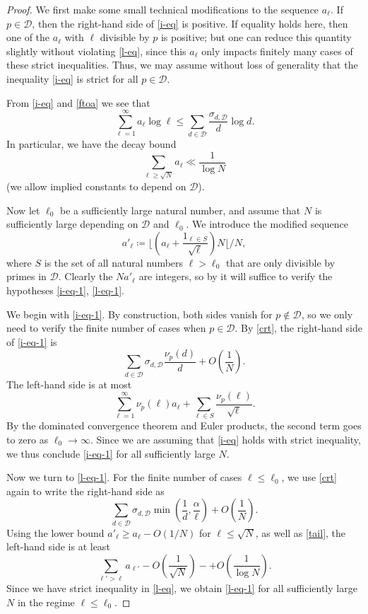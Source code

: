\documentclass[12pt,a4paper,reqno]{amsart}
\numberwithin{equation}{section}
\theoremstyle{plain}
\theoremstyle{definition}
\begin{document}
\begin{proof}  We first make some small technical modifications to the sequence $a_\ell$. If $p \in {\mathcal D}$, then the right-hand side of \eqref{i-eq} is positive.  If equality holds here, then one of the $a_\ell$ with $\ell$ divisible by $p$ is positive; but one can reduce this quantity slightly without violating \eqref{l-eq}, since this $a_\ell$ only impacts finitely many cases of these strict inequalities.  Thus, we may assume without loss of generality that the inequality \eqref{i-eq} is strict for all $p \in {\mathcal D}$.

From \eqref{i-eq} and \eqref{ftoa} we see that
$$ \sum_{\ell=1}^\infty a_\ell \log \ell \leq \sum_{d \in {\mathcal D}} \frac{\sigma_{d,{\mathcal D}}}{d} \log d.$$
In particular, we have the decay bound
\begin{equation}\label{tail}
  \sum_{\ell \geq \sqrt{N}} a_\ell \ll \frac{1}{\log N}
\end{equation}
(we allow implied constants to depend on ${\mathcal D}$).

Now let $\ell_0$ be a sufficiently large natural number, and assume that $N$ is sufficiently large depending on ${\mathcal D}$ and $\ell_0$.  We introduce the modified sequence
$$ a'_\ell \coloneqq \lfloor (a_\ell + \frac{1_{\ell \in S}}{\sqrt{\ell}}) N \lfloor / N,$$
where $S$ is the set of all natural numbers $\ell > \ell_0$ that are only divisible by primes in ${\mathcal D}$.
Clearly the $N a'_\ell$ are integers, so by  it will suffice to verify the hypotheses \eqref{i-eq-1}, \eqref{l-eq-1}.

We begin with \eqref{i-eq-1}.  By construction, both sides vanish for $p \not \in {\mathcal D}$, so we only need to verify the finite number of cases when $p \in {\mathcal D}$.  By \eqref{crt}, the right-hand side of \eqref{i-eq-1} is 
$$ \sum_{d \in {\mathcal D}} \sigma_{d,{\mathcal D}} \frac{\nu_p(d)}{d} + O\left(\frac{1}{N} \right).$$
The left-hand side is at most
$$ \sum_{\ell=1}^\infty \nu_p(\ell) a_\ell + \sum_{\ell \in S} \frac{\nu_p(\ell)}{\sqrt{\ell}}.$$
By the dominated convergence theorem and Euler products, the second term goes to zero as $\ell_0 \to \infty$.  Since we are assuming that \eqref{i-eq} holds with strict inequality, we thus conclude \eqref{i-eq-1} for all sufficiently large $N$.

Now we turn to \eqref{l-eq-1}.  For the finite number of cases $\ell \leq \ell_0$, we use \eqref{crt} again to write the right-hand side as
$$ \sum_{d \in {\mathcal D}} \sigma_{d,{\mathcal D}} \min\left( \frac{1}{d}, \frac{\alpha}{\ell}\right) + O\left(\frac{1}{N} \right).$$
Using the lower bound $a'_\ell \geq a_\ell - O(1/N)$ for $\ell \leq \sqrt{N}$, as well as \eqref{tail}, the left-hand side is at least
$$ \sum_{\ell' > \ell} a_{\ell'} - O\left(\frac{1}{\sqrt{N}} \right) - + O\left(\frac{1}{\log N} \right).$$
Since we have strict inequality in \eqref{l-eq}, we obtain \eqref{l-eq-1} for all sufficiently large $N$ in the regime $\ell \leq \ell_0$.


\end{proof}
\end{document}
